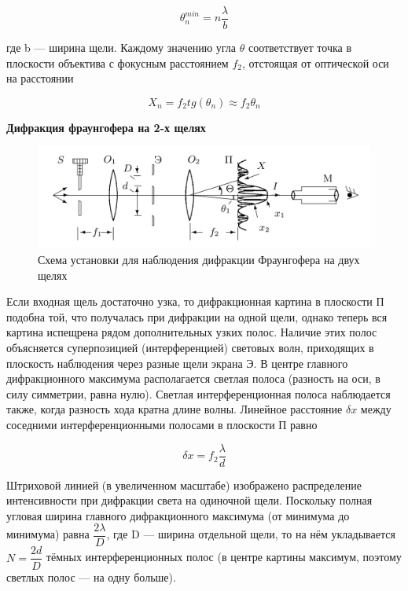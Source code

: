 \documentclass[a4paper, 12pt]{article}
\begin{document}
    \begin{equation*}
        \theta^{min}_n = n\dfrac{\lambda}{b}
    \end{equation*}

    где b — ширина щели. Каждому значению угла $\theta$ соответствует 
    точка в плоскости объектива с фокусным расстоянием $f_2$, 
    отстоящая от оптической оси на расстоянии

    \begin{equation*}
        X_n = f_2tg(\theta_n) \approx f_2 \theta_n
    \end{equation*}

    \textbf{Дифракция фраунгофера на 2-х щелях}
    \begin{figure}
        \centering
        \includegraphics[width=0.6\linewidth]{fraun_two_setup.png}
        \caption{Схема установки для наблюдения дифракции Фраунгофера на двух щелях}
        \label{fig:fraun_two}
    \end{figure}

    Если входная щель достаточно узка, то дифракционная картина в     плоскости П подобна той, что получалась при дифракции на одной     щели, однако теперь вся картина испещрена рядом дополнительных     узких полос. Наличие этих полос объясняется суперпозицией (интерференцией) световых волн, приходящих в плоскость наблюдения через разные щели экрана Э. В центре главного дифракционного максимума располагается светлая полоса (разность 
    на оси, в силу симметрии, равна нулю). Светлая интерференционная полоса наблюдается также, когда разность хода кратна длине волны. Линейное расстояние $\delta x$ между соседними интерференционными полосами в плоскости П равно
    
    \begin{equation*}
        \delta x = f_2 \dfrac{\lambda}{d}
    \end{equation*}

    Штриховой линией (в увеличенном масштабе) изображено распределение    интенсивности при дифракции света на одиночной щели. Поскольку полная угловая ширина главного дифракционного максимума (от минимума до минимума) равна $\dfrac{2\lambda}{D}$, где D — ширина отдельной щели, то на нём укладывается $N = \dfrac{2d}{D}$ тёмных интерференционных полос (в центре картины максимум, поэтому светлых полос — на одну больше).
\end{document}
